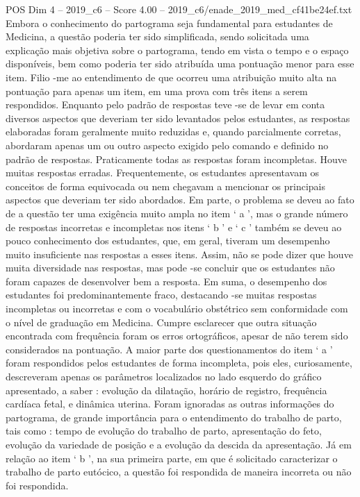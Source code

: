 \begin{textsample}{POS Dim 4 – 2019\_c6 – Score 4.00 – 2019\_c6/enade\_2019\_med\_cf41be24ef.txt}
Embora o conhecimento do partograma seja fundamental para estudantes de Medicina, a questão poderia ter sido simplificada, sendo solicitada uma explicação mais objetiva sobre o partograma, tendo em vista o tempo e o espaço disponíveis, bem como poderia ter sido atribuída uma pontuação menor para esse item.
Filio -me ao entendimento de que ocorreu uma atribuição muito alta na pontuação para apenas um item, em uma prova com três itens a serem respondidos.
Enquanto pelo padrão de respostas teve -se de levar em conta diversos aspectos que deveriam ter sido levantados pelos estudantes, as respostas elaboradas foram geralmente muito reduzidas e, quando parcialmente corretas, abordaram apenas um ou outro aspecto exigido pelo comando e definido no padrão de respostas.
Praticamente todas as respostas foram incompletas.
Houve muitas respostas erradas.
Frequentemente, os estudantes apresentavam os conceitos de forma equivocada ou nem chegavam a mencionar os principais aspectos que deveriam ter sido abordados.
Em parte, o problema se deveu ao fato de a questão ter uma exigência muito ampla no item ‘ a ’, mas o grande número de respostas incorretas e incompletas nos itens ‘ b ’ e ‘ c ’ também se deveu ao pouco conhecimento dos estudantes, que, em geral, tiveram um desempenho muito insuficiente nas respostas a esses itens.
Assim, não se pode dizer que houve muita diversidade nas respostas, mas pode -se concluir que os estudantes não foram capazes de desenvolver bem a resposta.
Em suma, o desempenho dos estudantes foi predominantemente fraco, destacando -se muitas respostas incompletas ou incorretas e com o vocabulário obstétrico sem conformidade com o nível de graduação em Medicina.
Cumpre esclarecer que outra situação encontrada com frequência foram os erros ortográficos, apesar de não terem sido considerados na pontuação.
A maior parte dos questionamentos do item ‘ a ’ foram respondidos pelos estudantes de forma incompleta, pois eles, curiosamente, descreveram apenas os parâmetros localizados no lado esquerdo do gráfico apresentado, a saber : evolução da dilatação, horário de registro, frequência cardíaca fetal, e dinâmica uterina.
Foram ignoradas as outras informações do partograma, de grande importância para o entendimento do trabalho de parto, tais como : tempo de evolução do trabalho de parto, apresentação do feto, evolução da variedade de posição e a evolução da descida da apresentação.
Já em relação ao item ‘ b ’, na sua primeira parte, em que é solicitado caracterizar o trabalho de parto eutócico, a questão foi respondida de maneira incorreta ou não foi respondida.

\end{textsample}
